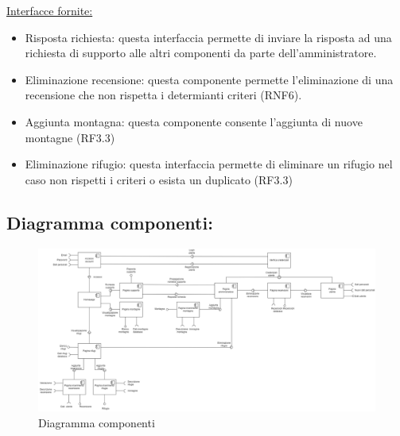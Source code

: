 \documentclass[a4paper,12pt]{article}
\begin{document}
\underline{Interfacce fornite:}
\begin{itemize}
\item Risposta richiesta: questa interfaccia permette di inviare la risposta ad una richiesta di supporto alle altri componenti da parte dell'amministratore.
\item Eliminazione recensione: questa componente permette l'eliminazione di una recensione che non rispetta i determianti criteri (RNF6).
\item Aggiunta montagna: questa componente consente l'aggiunta di nuove montagne (RF3.3)
\item Eliminazione rifugio: questa interfaccia permette di eliminare un rifugio nel caso non rispetti i criteri o esista un duplicato (RF3.3)
\end{itemize}


\subsection{Diagramma componenti:}
\begin{figure}[H]
   \centering
   \includegraphics[width=1.4\textwidth, angle = 90]{
    img/diagramma_componenti.png}
    \caption{Diagramma componenti}
\end{figure}
\end{document}
